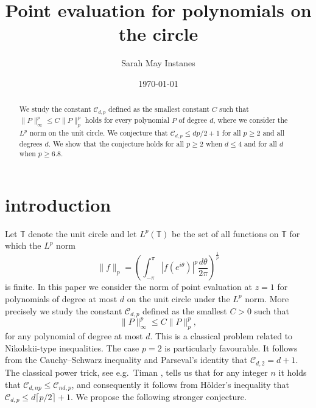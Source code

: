 \documentclass{amsart}
\author{Sarah May Instanes}
\date{\today}
\title{Point evaluation for polynomials on the circle}
\theoremstyle{plain}
\theoremstyle{remark}
\begin{document}
 
	\begin{abstract}
		We study the constant $\mathscr{C}_{d,p}$ defined as the smallest constant $C$ such that $\|P\|_\infty^p \leq C\|P\|_p^p$ holds for every polynomial $P$ of degree $d$, where we consider the $L^p$ norm on the unit circle. We conjecture that $\mathscr{C}_{d,p} \leq dp/2+1$ for all $p \geq 2$ and all degrees $d$. We show that the conjecture holds for all $p \geq 2$ when $d \leq 4$ and for all $d$ when $p \geq 6.8$. 
	\end{abstract}
	\maketitle
	\section{introduction}\label{sec:intro}
	Let $\mathbb{T}$ denote the unit circle and let $L^p(\mathbb{T})$ be the set of all functions on $\mathbb{T}$ for which the $L^p$ norm 
	\[\|f\|_p=\left(\int_{-\pi}^{\pi} |f(e^{i \theta})|^p \frac{d \theta}{2 \pi}\right)^{\frac{1}{p}}\] is finite. In this paper we consider the norm of point evaluation at $z=1$ for polynomials of degree at most $d$ on the unit circle under the $L^p$ norm. More precisely we study the constant $\mathscr{C}_{d,p}$ defined as the smallest $C>0$ such that
	\[\|P\|_\infty^p \leq C \|P\|_p^p,\]
	for any polynomial of degree at most $d$. This is a classical problem related to Nikolskii-type inequalities. The case $p=2$ is particularly favourable. It follows from the Cauchy--Schwarz inequality and Parseval's identity that $\mathscr{C}_{d,2}=d+1$. The classical power trick, see e.g.\ Timan \cite[page 229]{Timan}, tells us that for any integer $n$ it holds that $\mathscr{C}_{d,np} \leq \mathscr{C}_{nd,p}$, and consequently it follows from Hölder's inequality that $\mathscr{C}_{d,p} \leq d \lceil p/2\rceil+1$. We propose the following stronger conjecture.
	
\end{document}
